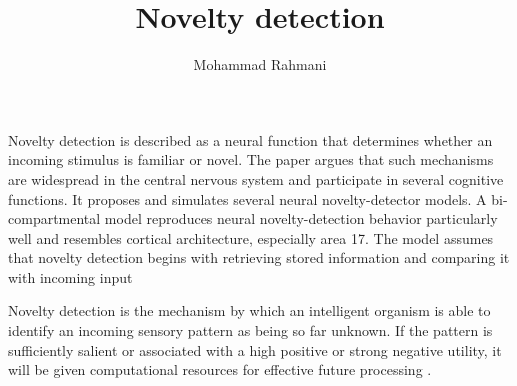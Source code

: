 \documentclass[a4paper]{article}
\title{Novelty detection}
\date{}
\author{Mohammad Rahmani}
\begin{document}
   \maketitle

   Novelty detection is described as a neural function that determines whether an incoming stimulus is familiar or novel.
   The paper argues that such mechanisms are widespread in the central nervous system and participate in several cognitive functions. It proposes and simulates several neural novelty-detector models. A bi-compartmental model reproduces neural novelty-detection behavior particularly well and resembles cortical architecture, especially area 17. The model assumes that novelty detection begins with retrieving stored information and comparing it with incoming input \cite{salu-1988-models-of-neural-novelty-detectors-with-similarities-to-cerebral-cortex}

   Novelty detection is the mechanism by which an intelligent organism is able to identify an incoming sensory pattern as being so far unknown. If the pattern is sufficiently salient or associated with a high positive or strong negative utility, it will be given computational resources for effective future processing .

   
   
\end{document}
